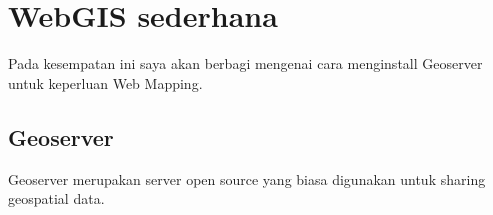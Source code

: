 \documentclass[12pt]{report}
\begin{document}

\newpage
\chapter*{WebGIS sederhana}
Pada kesempatan ini saya akan berbagi mengenai cara menginstall Geoserver untuk keperluan Web Mapping.

\section*{Geoserver}
Geoserver merupakan server open source yang biasa digunakan untuk sharing geospatial data. 
\end{document}
